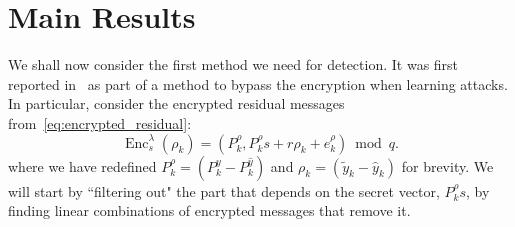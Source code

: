 \documentclass[journal, twoside, web]{ieeecolorpreprint}
\DeclareMathOperator{\enc}{Enc}
\begin{document}


\section{Main Results}\label{sec:results}

We shall now consider the first method we need for detection. It was first reported in~\cite{alisic2023modelfreelwe} as part of a method to bypass the encryption when learning attacks. In particular, consider the encrypted residual messages from~\eqref{eq:encrypted_residual}:
\begin{equation*} 
    \enc^\lambda_s(\rho_k) = (P_k^\rho, P_k^\rho s+r\rho_k+e_k^\rho) \bmod q.
\end{equation*}
where we have redefined $P_k^\rho= (P_k^y-P_k^{\hat y}) $ and $\rho_k= (\tilde y_k-\hat y_k)$ for brevity. We will start by ``filtering out" the part that depends on the secret vector, $P_k^\rho s$, by finding linear combinations of encrypted messages that remove it.%
\end{document}
